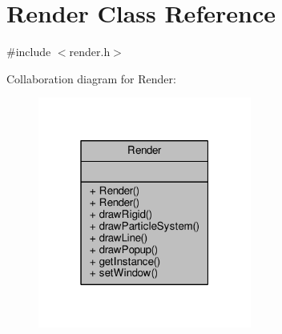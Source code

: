 \hypertarget{classRender}{}\section{Render Class Reference}
\label{classRender}


{\ttfamily \#include $<$render.\+h$>$}



Collaboration diagram for Render\+:\nopagebreak
\begin{figure}[H]
\begin{center}
\leavevmode
\includegraphics[width=199pt]{classRender__coll__graph}
\end{center}
\end{figure}
